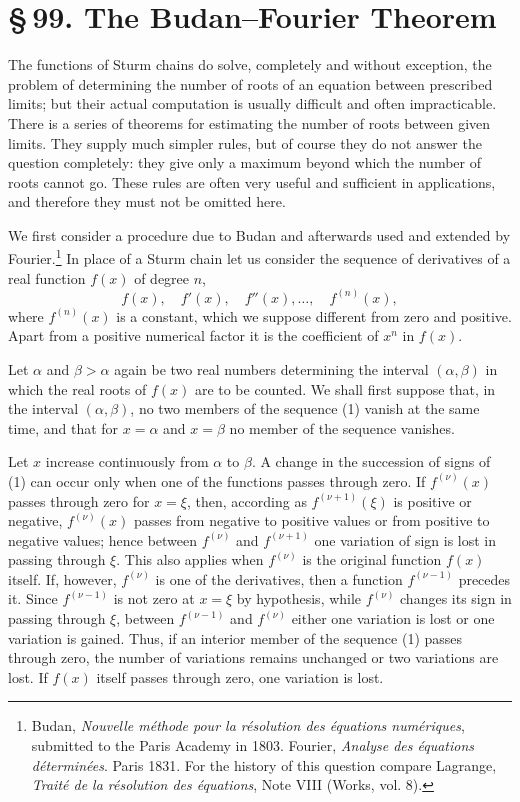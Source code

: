 \documentclass[11pt]{article}
\providecommand{\sect}[2]{\section*{\S\,#1. #2}}
\begin{document}
\sect{99}{The Budan--Fourier Theorem}

The functions of Sturm chains do solve, completely and without exception, the problem of determining the number of roots of an equation between prescribed limits; but their actual computation is usually difficult and often impracticable. There is a series of theorems for estimating the number of roots between given limits. They supply much simpler rules, but of course they do not answer the question completely: they give only a maximum beyond which the number of roots cannot go. These rules are often very useful and sufficient in applications, and therefore they must not be omitted here.

We first consider a procedure due to Budan and afterwards used and extended by Fourier.\footnote{Budan, \emph{Nouvelle méthode pour la résolution des équations numériques}, submitted to the Paris Academy in 1803. Fourier, \emph{Analyse des équations déterminées}. Paris 1831. For the history of this question compare Lagrange, \emph{Traité de la résolution des équations}, Note VIII (Works, vol. 8).} In place of a Sturm chain let us consider the sequence of derivatives of a real function $f(x)$ of degree $n$,
\begin{equation}
        f(x),\quad f'(x),\quad f''(x),\ldots,\quad f^{(n)}(x),
\tag{1}
\end{equation}
where $f^{(n)}(x)$ is a constant, which we suppose different from zero and positive. Apart from a positive numerical factor it is the coefficient of $x^n$ in $f(x)$.

Let $\alpha$ and $\beta>\alpha$ again be two real numbers determining the interval $(\alpha,\beta)$ in which the real roots of $f(x)$ are to be counted. We shall first suppose that, in the interval $(\alpha,\beta)$, no two members of the sequence (1) vanish at the same time, and that for $x=\alpha$ and $x=\beta$ no member of the sequence vanishes.

Let $x$ increase continuously from $\alpha$ to $\beta$. A change in the succession of signs of (1) can occur only when one of the functions passes through zero. If $f^{(\nu)}(x)$ passes through zero for $x=\xi$, then, according as $f^{(\nu+1)}(\xi)$ is positive or negative, $f^{(\nu)}(x)$ passes from negative to positive values or from positive to negative values; hence between $f^{(\nu)}$ and $f^{(\nu+1)}$ one variation of sign is lost in passing through $\xi$. This also applies when $f^{(\nu)}$ is the original function $f(x)$ itself. If, however, $f^{(\nu)}$ is one of the derivatives, then a function $f^{(\nu-1)}$ precedes it. Since $f^{(\nu-1)}$ is not zero at $x=\xi$ by hypothesis, while $f^{(\nu)}$ changes its sign in passing through $\xi$, between $f^{(\nu-1)}$ and $f^{(\nu)}$ either one variation is lost or one variation is gained. Thus, if an interior member of the sequence (1) passes through zero, the number of variations remains unchanged or two variations are lost. If $f(x)$ itself passes through zero, one variation is lost.
\end{document}
